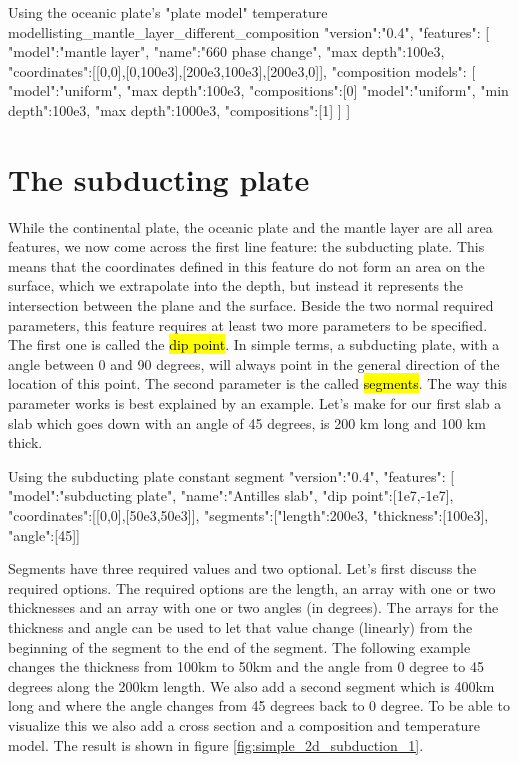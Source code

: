 \documentclass{book}
\begin{document}
\begin{javascriptcode}{Using the oceanic plate's "plate model" temperature model}{listing_mantle_layer_different_composition}
{
  "version":"0.4",
  "features":
  [
    {
      "model":"mantle layer", "name":"660 phase change", "max depth":100e3,
      "coordinates":[[0,0],[0,100e3],[200e3,100e3],[200e3,0]],
      "composition models":
      [
        {"model":"uniform", "max depth":100e3, "compositions":[0]}
        {"model":"uniform", "min depth":100e3, "max depth":1000e3, "compositions":[1]}
      ]
    }
  ]
}
\end{javascriptcode}

\section{The subducting plate}
While the continental plate, the oceanic plate and the mantle layer are all area features, we now come across the first line feature: the subducting plate. This means that the coordinates defined in this feature do not form an area on the surface, which we extrapolate into the depth, but instead it represents the intersection between the plane and the surface. Beside the two normal required parameters, this feature requires at least two more parameters to be specified. The first one is called the \hl{dip point}. In simple terms, a subducting plate, with a angle between 0 and 90 degrees, will always point in the general direction of the location of this point. The second parameter is the called \hl{segments}. The way this parameter works is best explained by an example. Let's make for our first slab a slab which goes down with an angle of 45 degrees, is 200 km long and 100 km thick.

\begin{javascriptcode}{Using the subducting plate constant segment}{}
{
"version":"0.4",
"features":
[
     {
       "model":"subducting plate", "name":"Antilles slab", "dip point":[1e7,-1e7],
       "coordinates":[[0,0],[50e3,50e3]], 
       "segments":[{"length":200e3, "thickness":[100e3], "angle":[45]}]
    }
}
\end{javascriptcode}

Segments have three required values and two optional. Let's first discuss the required options. The required options are the length, an array with one or two thicknesses and an array with one or two angles (in degrees). The arrays for the thickness and angle can be used to let that value change (linearly) from the beginning of the segment to the end of the segment. The following example changes the thickness from 100km to 50km and the angle from 0 degree to 45 degrees along the 200km length. We also add a second segment which is 400km long and where the angle changes from 45 degrees back to 0 degree. To be able to visualize this we also add a cross section and a composition and temperature model. The result is shown in figure \ref{fig:simple_2d_subduction_1}.
\end{document}
